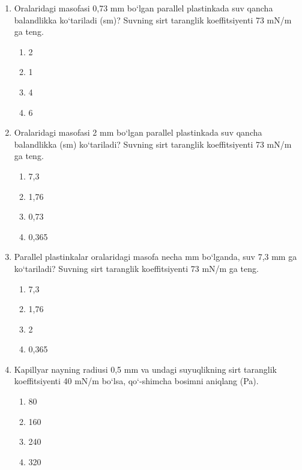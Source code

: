 \begin{enumerate}
\item Oralaridagi masofasi 0,73 mm bo‘lgan parallel plastinkada suv qancha balandlikka ko‘tariladi (sm)? Suvning sirt taranglik koeffitsiyenti 73 mN/m ga teng.
\begin{enumerate}[label=\Alph*)]
\item 2
\item 1
\item 4
\item 6
\end{enumerate}

\item Oralaridagi masofasi 2 mm bo‘lgan parallel plastinkada suv qancha balandlikka (sm) ko‘tariladi? Suvning sirt taranglik koeffitsiyenti 73 mN/m ga teng.
\begin{enumerate}[label=\Alph*)]
\item 7,3
\item 1,76
\item 0,73
\item 0,365
\end{enumerate}

\item Parallel plastinkalar oralaridagi masofa necha mm bo‘lganda, suv 7,3 mm ga ko‘tariladi? Suvning sirt taranglik koeffitsiyenti 73 mN/m ga teng.
\begin{enumerate}[label=\Alph*)]
\item 7,3
\item 1,76
\item 2
\item 0,365
\end{enumerate}

\item Kapillyar nayning radiusi 0,5 mm va undagi suyuqlikning sirt taranglik koeffitsiyenti 40 mN/m bo‘lsa, qo‘-shimcha bosimni aniqlang (Pa).
\begin{enumerate}[label=\Alph*)]
\item 80
\item 160
\item 240
\item 320
\end{enumerate}

\end{enumerate}




